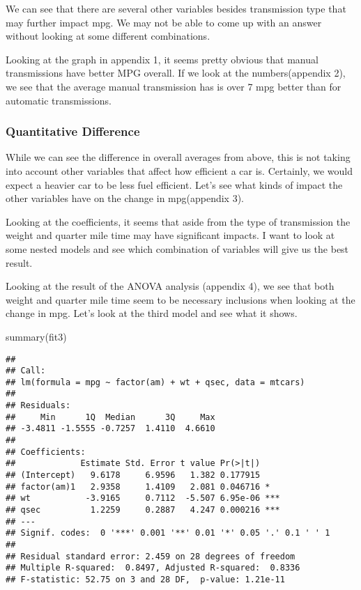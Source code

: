 \documentclass[
]{article}
\newenvironment{Shaded}{\begin{snugshade}}{\end{snugshade}}
\newcommand{\FunctionTok}[1]{\textcolor[rgb]{0.00,0.00,0.00}{#1}}
\newcommand{\NormalTok}[1]{#1}
\begin{document}
We can see that there are several other variables besides transmission
type that may further impact mpg. We may not be able to come up with an
answer without looking at some different combinations.

Looking at the graph in appendix 1, it seems pretty obvious that manual
transmissions have better MPG overall. If we look at the
numbers(appendix 2), we see that the average manual transmission has is
over 7 mpg better than for automatic transmissions.

\hypertarget{quantitative-difference}{%
\subsubsection{Quantitative Difference}\label{quantitative-difference}}

While we can see the difference in overall averages from above, this is
not taking into account other variables that affect how efficient a car
is. Certainly, we would expect a heavier car to be less fuel efficient.
Let's see what kinds of impact the other variables have on the change in
mpg(appendix 3).

Looking at the coefficients, it seems that aside from the type of
transmission the weight and quarter mile time may have significant
impacts. I want to look at some nested models and see which combination
of variables will give us the best result.

Looking at the result of the ANOVA analysis (appendix 4), we see that
both weight and quarter mile time seem to be necessary inclusions when
looking at the change in mpg. Let's look at the third model and see what
it shows.

\begin{Shaded}
\begin{Highlighting}[]
\FunctionTok{summary}\NormalTok{(fit3)}
\end{Highlighting}
\end{Shaded}

\begin{verbatim}
## 
## Call:
## lm(formula = mpg ~ factor(am) + wt + qsec, data = mtcars)
## 
## Residuals:
##     Min      1Q  Median      3Q     Max 
## -3.4811 -1.5555 -0.7257  1.4110  4.6610 
## 
## Coefficients:
##             Estimate Std. Error t value Pr(>|t|)    
## (Intercept)   9.6178     6.9596   1.382 0.177915    
## factor(am)1   2.9358     1.4109   2.081 0.046716 *  
## wt           -3.9165     0.7112  -5.507 6.95e-06 ***
## qsec          1.2259     0.2887   4.247 0.000216 ***
## ---
## Signif. codes:  0 '***' 0.001 '**' 0.01 '*' 0.05 '.' 0.1 ' ' 1
## 
## Residual standard error: 2.459 on 28 degrees of freedom
## Multiple R-squared:  0.8497, Adjusted R-squared:  0.8336 
## F-statistic: 52.75 on 3 and 28 DF,  p-value: 1.21e-11
\end{verbatim}
\end{document}
